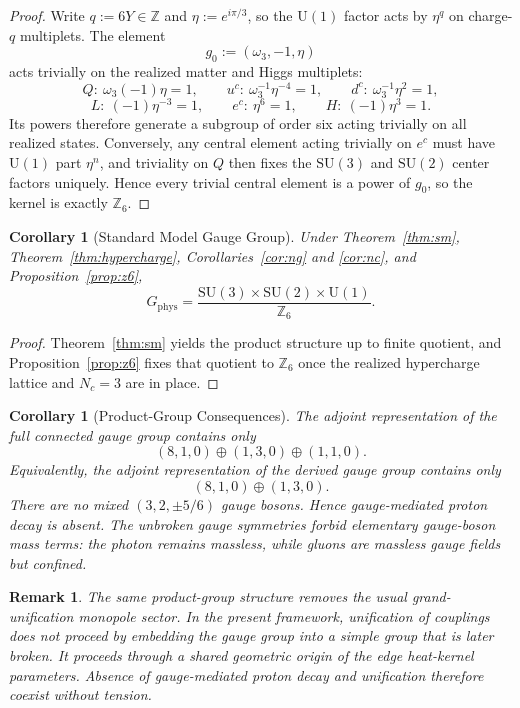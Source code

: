 \documentclass[11pt]{article}
\newtheorem{corollary}[theorem]{Corollary}
\newtheorem{remark}[theorem]{Remark}
\newcommand{\SU}{\mathrm{SU}}
\newcommand{\U}{\mathrm{U}}
\begin{document}
\begin{proof}
Write $q:=6Y\in\mathbb Z$ and $\eta:=e^{i\pi/3}$, so the $\U(1)$ factor acts by $\eta^q$ on charge-$q$ multiplets. The element
\[
g_0:=(\omega_3,-1,\eta)
\]
acts trivially on the realized matter and Higgs multiplets:
\[
Q:\ \omega_3(-1)\eta=1,\qquad
u^c:\ \omega_3^{-1}\eta^{-4}=1,\qquad
d^c:\ \omega_3^{-1}\eta^2=1,
\]
\[
L:\ (-1)\eta^{-3}=1,\qquad
e^c:\ \eta^6=1,\qquad
H:\ (-1)\eta^3=1.
\]
Its powers therefore generate a subgroup of order six acting trivially on all realized states. Conversely, any central element acting trivially on $e^c$ must have $\U(1)$ part $\eta^n$, and triviality on $Q$ then fixes the $\SU(3)$ and $\SU(2)$ center factors uniquely. Hence every trivial central element is a power of $g_0$, so the kernel is exactly $\mathbb Z_6$.
\end{proof}

\begin{corollary}[Standard Model Gauge Group]
Under Theorem~\ref{thm:sm}, Theorem~\ref{thm:hypercharge}, Corollaries~\ref{cor:ng} and \ref{cor:nc}, and Proposition~\ref{prop:z6},
\[
G_{\mathrm{phys}}=
\frac{\SU(3)\times\SU(2)\times\U(1)}{\mathbb Z_6}.
\]
\end{corollary}

\begin{proof}
Theorem~\ref{thm:sm} yields the product structure up to finite quotient, and Proposition~\ref{prop:z6} fixes that quotient to $\mathbb Z_6$ once the realized hypercharge lattice and $N_c=3$ are in place.
\end{proof}

\begin{corollary}[Product-Group Consequences]
The adjoint representation of the full connected gauge group contains only
\[
(8,1,0)\oplus(1,3,0)\oplus(1,1,0).
\]
Equivalently, the adjoint representation of the derived gauge group contains only
\[
(8,1,0)\oplus(1,3,0).
\]
There are no mixed $(3,2,\pm 5/6)$ gauge bosons. Hence gauge-mediated proton decay is absent. The unbroken gauge symmetries forbid elementary gauge-boson mass terms: the photon remains massless, while gluons are massless gauge fields but confined.
\end{corollary}

\begin{remark}
The same product-group structure removes the usual grand-unification monopole sector. In the present framework, unification of couplings does not proceed by embedding the gauge group into a simple group that is later broken. It proceeds through a shared geometric origin of the edge heat-kernel parameters. Absence of gauge-mediated proton decay and unification therefore coexist without tension.
\end{remark}
\end{document}
